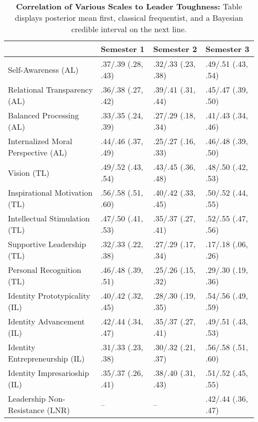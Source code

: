 \begin{table}[ht]
\centering
\begin{tabular}{llll}
  \hline
 & Semester 1 & Semester 2 & Semester 3 \\ 
  \hline
Self-Awareness (AL) & .37/.39 (.28, .43) & .32/.33 (.23, .38) & .49/.51 (.43, .54) \\ 
  Relational Transparency (AL) & .36/.38 (.27, .42) & .39/.41 (.31, .44) & .45/.47 (.39, .50) \\ 
  Balanced Processing (AL) & .33/.35 (.24, .39) & .27/.29 (.18, .34) & .41/.43 (.34, .46) \\ 
  Internalized Moral Perspective (AL) & .44/.46 (.37, .49) & .25/.27 (.16, .33) & .46/.48 (.39, .50) \\ 
  Vision (TL) & .49/.52 (.43, .54) & .43/.45 (.36, .48) & .48/.50 (.42, .53) \\ 
  Inspirational Motivation (TL) & .56/.58 (.51, .60) & .40/.42 (.33, .45) & .50/.52 (.44, .55) \\ 
  Intellectual Stimulation (TL) & .47/.50 (.41, .53) & .35/.37 (.27, .41) & .52/.55 (.47, .56) \\ 
  Supportive Leadership (TL) & .32/.33 (.22, .38) & .27/.29 (.17, .34) & .17/.18 (.06, .26) \\ 
  Personal Recognition (TL) & .46/.48 (.39, .51) & .25/.26 (.15, .32) & .29/.30 (.19, .36) \\ 
  Identity Prototypicality (IL) & .40/.42 (.32, .45) & .28/.30 (.19, .35) & .54/.56 (.49, .59) \\ 
  Identity Advancement (IL) & .42/.44 (.34, .47) & .35/.37 (.27, .41) & .49/.51 (.43, .53) \\ 
  Identity Entrepreneurship (IL) & .31/.33 (.23, .38) & .30/.32 (.21, .37) & .56/.58 (.51, .60) \\ 
  Identity Impresarioship (IL) & .35/.37 (.26, .41) & .38/.40 (.31, .43) & .51/.52 (.45, .55) \\ 
  Leadership Non-Resistance (LNR) & -- & -- & .42/.44 (.36, .47) \\ 
   \hline
\end{tabular}
\caption{\textbf{Correlation of Various Scales to Leader Toughness:} Table displays posterior mean first, classical frequentist, and a Bayesian credible interval on the next line.} 
\label{tab:lead_corr}
\end{table}
